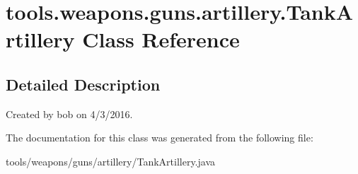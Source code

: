 \hypertarget{classtools_1_1weapons_1_1guns_1_1artillery_1_1_tank_artillery}{}\section{tools.\+weapons.\+guns.\+artillery.\+Tank\+Artillery Class Reference}
\label{classtools_1_1weapons_1_1guns_1_1artillery_1_1_tank_artillery}


\subsection{Detailed Description}
Created by bob on 4/3/2016. 

The documentation for this class was generated from the following file\+:\begin{DoxyCompactItemize}
\item 
tools/weapons/guns/artillery/Tank\+Artillery.\+java\end{DoxyCompactItemize}
